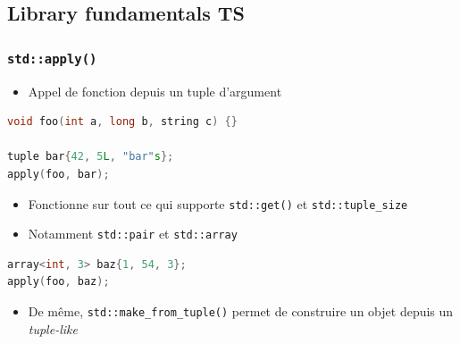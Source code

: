 \documentclass[C++.tex]{subfiles}
\begin{document}
\subsection*{Library fundamentals TS}
\begin{frame}[fragile]
	\frametitle{\lstinline|std::apply()|}
	\begin{itemize}
		\item Appel de fonction depuis un tuple d'argument
	\end{itemize}

	\begin{lstlisting}[language=C++]
void foo(int a, long b, string c) {}

tuple bar{42, 5L, "bar"s};
apply(foo, bar);\end{lstlisting}

	\begin{itemize}
		\item Fonctionne sur tout ce qui supporte \lstinline|std::get()| et \lstinline|std::tuple_size|
		\item Notamment \lstinline|std::pair| et \lstinline|std::array|
	\end{itemize}

	\begin{lstlisting}[language=C++]
array<int, 3> baz{1, 54, 3};
apply(foo, baz);\end{lstlisting}

	\begin{itemize}
		\item De même, \lstinline|std::make_from_tuple()| permet de construire un objet depuis un \textit{tuple-like}
	\end{itemize}
\end{frame}
\end{document}
